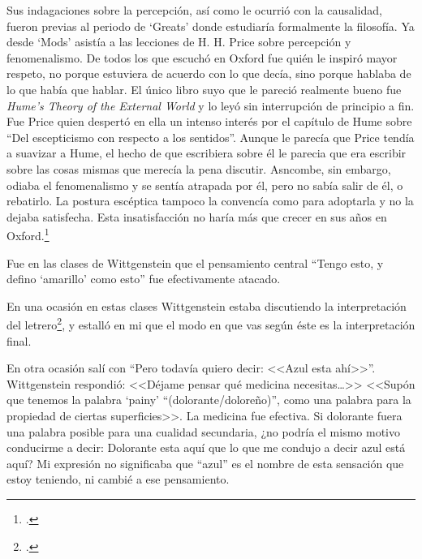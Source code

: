 Sus indagaciones sobre la percepción, así como le ocurrió con la causalidad,
fueron previas al periodo de `Greats' donde estudiaría formalmente la filosofía.
Ya desde `Mods' asistía a las lecciones de H. H. Price sobre percepción y
fenomenalismo. De todos los que escuchó en Oxford fue quién le inspiró mayor
respeto, no porque estuviera de acuerdo con lo que decía, sino porque hablaba de
lo que había que hablar. El único libro suyo que le pareció realmente bueno fue
\emph{Hume's Theory of the External World} y lo leyó sin interrupción de
principio a fin. Fue Price quien despertó en ella un intenso interés por el
capítulo de Hume sobre ``Del escepticismo con respecto a los sentidos''. Aunque
le parecía que Price tendía a suavizar a Hume, el hecho de que escribiera sobre
él le parecia que era escribir sobre las cosas mismas que merecía la pena
discutir. Asncombe, sin embargo, odiaba el fenomenalismo y se sentía atrapada
por él, pero no sabía salir de él, o rebatirlo. La postura escéptica tampoco la
convencía como para adoptarla y no la dejaba satisfecha. Esta insatisfacción no
haría más que crecer en sus años en Oxford.\footcite[cf.~][p.~viii \S1]{M&PotM}


Fue en las clases de Wittgenstein que el pensamiento central ``Tengo esto, y
 defino `amarillo' como esto'' fue efectivamente atacado.

 En una ocasión en estas clases Wittgenstein estaba discutiendo la interpretación
 del letrero\footcite[p.~86~\S198]{PI}, y estalló en mi que el modo en que vas
 según éste es la interpretación final.

 En otra ocasión salí con ``Pero todavía quiero decir: <<Azul esta ahí>>''.
 Wittgenstein respondió: <<Déjame pensar qué medicina necesitas\ldots>> <<Supón
 que tenemos la palabra `painy' ``(dolorante/doloreño)'', como una palabra para
 la propiedad de ciertas superficies>>. La medicina fue efectiva. Si dolorante
 fuera una palabra posible para una cualidad secundaria, ¿no podría el mismo
 motivo conducirme a decir: Dolorante esta aquí que lo que me condujo a decir
 azul está aquí? Mi expresión no significaba que ``azul'' es el nombre de esta
 sensación que estoy teniendo, ni cambié a ese pensamiento.

